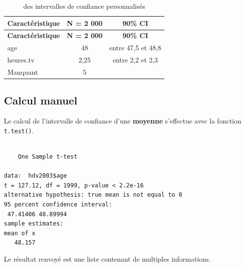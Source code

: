 \documentclass[
  letterpaper,
  DIV=11,
  numbers=noendperiod,
  oneside]{scrreprt}
\newenvironment{Shaded}{\begin{snugshade}}{\end{snugshade}}
\newcommand{\FunctionTok}[1]{\textcolor[rgb]{0.28,0.35,0.67}{#1}}
\newcommand{\NormalTok}[1]{\textcolor[rgb]{0.00,0.23,0.31}{#1}}
\newcommand{\SpecialCharTok}[1]{\textcolor[rgb]{0.37,0.37,0.37}{#1}}
\begin{document}
\hypertarget{tbl-add_ci-2}{}
\begin{longtable}[]{@{}lcc@{}}
\caption{\label{tbl-add_ci-2}des intervalles de confiance
personnalisés}\tabularnewline
\toprule()
\textbf{Caractéristique} & \textbf{N = 2 000} & \textbf{90\% CI} \\
\midrule()
\endfirsthead
\toprule()
\textbf{Caractéristique} & \textbf{N = 2 000} & \textbf{90\% CI} \\
\midrule()
\endhead
age & 48 & entre 47,5 et 48,8 \\
heures.tv & 2,25 & entre 2,2 et 2,3 \\
Manquant & 5 & \\
\bottomrule()
\end{longtable}

\hypertarget{calcul-manuel-1}{%
\subsection{Calcul manuel}\label{calcul-manuel-1}}

Le calcul de l'intervalle de confiance d'une \textbf{moyenne} s'effectue
avec la fonction \texttt{t.test()}.

\begin{Shaded}
\end{Shaded}

\begin{verbatim}

    One Sample t-test

data:  hdv2003$age
t = 127.12, df = 1999, p-value < 2.2e-16
alternative hypothesis: true mean is not equal to 0
95 percent confidence interval:
 47.41406 48.89994
sample estimates:
mean of x 
   48.157 
\end{verbatim}

Le résultat renvoyé est une liste contenant de multiples informations.

\begin{Shaded}
\end{Shaded}
\end{document}

